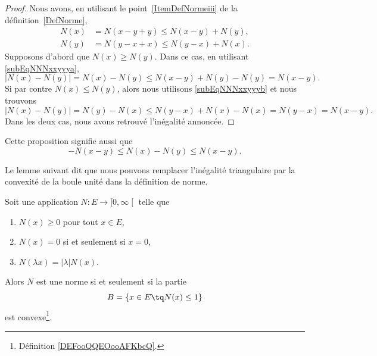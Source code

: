 \begin{proof}
	Nous avons, en utilisant le point~\ref{ItemDefNormeiii} de la définition~\ref{DefNorme},
	\begin{subequations}
		\begin{align}
			N(x) & =N(x-y+y)\leq N(x-y)+N(y),	\label{subEqNNNxxyyya} \\
			N(y) & =N(y-x+x)\leq N(y-x)+N(x).	\label{subEqNNNxxyyyb}
		\end{align}
	\end{subequations}
	Supposons d'abord que \( N(x)\geq N(y)\). Dans ce cas, en utilisant \eqref{subEqNNNxxyyya},
	\begin{equation}
		\big| N(x)-N(y) \big|=N(x)-N(y)\leq N(x-y)+N(y)-N(y)=N(x-y).
	\end{equation}
	Si par contre \( N(x)\leq N(y)\), alors nous utilisons \eqref{subEqNNNxxyyyb} et nous trouvons
	\begin{equation}
		\big| N(x)-N(y) \big|=N(y)-N(x)\leq N(y-x)+N(x)-N(x)=N(y-x)=N(x-y).
	\end{equation}
	Dans les deux cas, nous avons retrouvé l'inégalité annoncée.
\end{proof}
Cette proposition signifie aussi que
\begin{equation}	\label{EqNleqNNleqNvqlqbs}
	-N(x-y)\leq N(x)-N(y)\leq N(x-y).
\end{equation}

Le lemme suivant dit que nous pouvons remplacer l'inégalité triangulaire par la convexité de la boule unité dans la définition de norme.
\begin{lemma}     \label{LEMooAVIJooFhdXXr}
	Soit une application \( N\colon E\to \mathopen[ 0 , \infty \mathclose[\) telle que
	\begin{enumerate}
		\item
		      \( N(x)\geq 0\) pour tout \( x\in E\),
		\item
		      \( N(x)=0\) si et seulement si \( x=0\),
		\item
		      \( N(\lambda x)=| \lambda | N(x)\).
	\end{enumerate}
	Alors \( N\) est une norme si et seulement si la partie
	\begin{equation}
		B = \{ x\in E\tq N(x)\leq 1 \}
	\end{equation}
	est convexe\footnote{Définition \ref{DEFooQQEOooAFKbcQ}.}.
\end{lemma}

